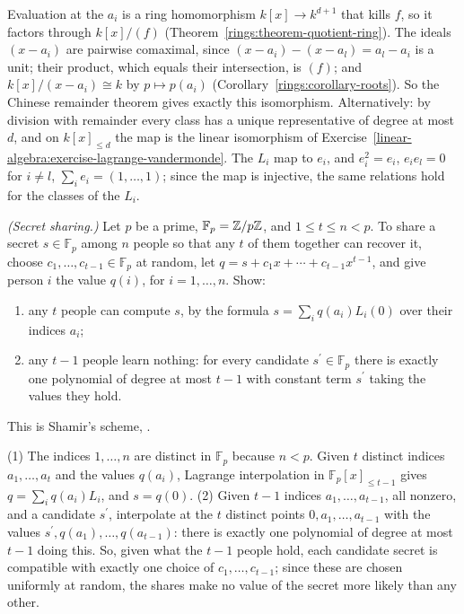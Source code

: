 \begin{solution}
Evaluation at the $a_i$ is a ring homomorphism $k[x] \to k^{d+1}$ that kills $f$, so it factors through $k[x]/(f)$ (Theorem~\ref{rings:theorem-quotient-ring}). The ideals $(x - a_i)$ are pairwise comaximal, since
$(x - a_i) - (x - a_l) = a_l - a_i$ is a unit; their product, which equals their intersection, is $(f)$; and $k[x]/(x - a_i) \cong k$ by $p \mapsto p(a_i)$ (Corollary~\ref{rings:corollary-roots}). So the
Chinese remainder theorem gives exactly this isomorphism. Alternatively: by division with remainder every class has a unique representative of degree at most $d$, and on $k[x]_{\leq d}$ the map is the linear
isomorphism of Exercise~\ref{linear-algebra:exercise-lagrange-vandermonde}. The $L_i$ map to $e_i$, and $e_i^2 = e_i$, $e_ie_l = 0$ for $i \neq l$, $\sum_ie_i = (1, \ldots, 1)$; since the map is injective, the same
relations hold for the classes of the $L_i$.
\end{solution}

\begin{exercise}\label{linear-algebra:exercise-shamir}
\emph{(Secret sharing.)} Let $p$ be a prime, $\mathbb{F}_p = \mathbb{Z}/p\mathbb{Z}$, and $1 \leq t \leq n < p$. To share a secret $s \in \mathbb{F}_p$ among $n$ people so that any $t$ of them together can recover it, choose
$c_1, \ldots, c_{t-1} \in \mathbb{F}_p$ at random, let $q = s + c_1x + \cdots + c_{t-1}x^{t-1}$, and give person $i$ the value $q(i)$, for $i = 1, \ldots, n$. Show:
\begin{enumerate}
\item any $t$ people can compute $s$, by the formula $s = \sum_iq(a_i)L_i(0)$ over their indices $a_i$;
\item any $t - 1$ people learn nothing: for every candidate $s^{\prime} \in \mathbb{F}_p$ there is exactly one polynomial of degree at most $t - 1$ with constant term $s^{\prime}$ taking the values they hold.
\end{enumerate}
This is Shamir's scheme, \cite{shamir-1979}.
\end{exercise}

\begin{solution}
(1) The indices $1, \ldots, n$ are distinct in $\mathbb{F}_p$ because $n < p$. Given $t$ distinct indices $a_1, \ldots, a_t$ and the values $q(a_i)$, Lagrange interpolation in $\mathbb{F}_p[x]_{\leq t-1}$ gives $q = \sum_iq(a_i)L_i$,
and $s = q(0)$. (2) Given $t - 1$ indices $a_1, \ldots, a_{t-1}$, all nonzero, and a candidate $s^{\prime}$, interpolate at the $t$ distinct points $0, a_1, \ldots, a_{t-1}$ with the values $s^{\prime}, q(a_1), \ldots, q(a_{t-1})$: there is exactly one
polynomial of degree at most $t - 1$ doing this. So, given what the $t - 1$ people hold, each candidate secret is compatible with exactly one choice of $c_1, \ldots, c_{t-1}$; since these are chosen uniformly at
random, the shares make no value of the secret more likely than any other.
\end{solution}

